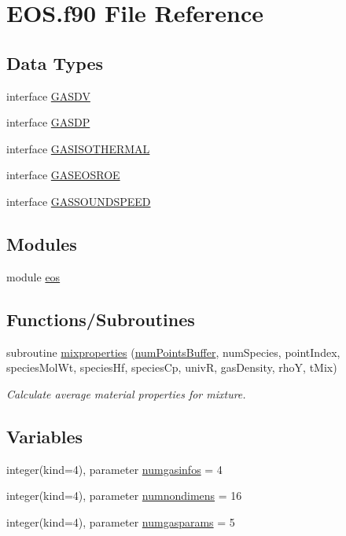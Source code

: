 \hypertarget{EOS_8f90}{}\section{E\+O\+S.\+f90 File Reference}
\label{EOS_8f90}
\subsection*{Data Types}
\begin{DoxyCompactItemize}
\item 
interface \hyperlink{interfaceeos_1_1GASDV}{G\+A\+S\+DV}
\item 
interface \hyperlink{interfaceeos_1_1GASDP}{G\+A\+S\+DP}
\item 
interface \hyperlink{interfaceeos_1_1GASISOTHERMAL}{G\+A\+S\+I\+S\+O\+T\+H\+E\+R\+M\+AL}
\item 
interface \hyperlink{interfaceeos_1_1GASEOSROE}{G\+A\+S\+E\+O\+S\+R\+OE}
\item 
interface \hyperlink{interfaceeos_1_1GASSOUNDSPEED}{G\+A\+S\+S\+O\+U\+N\+D\+S\+P\+E\+ED}
\end{DoxyCompactItemize}
\subsection*{Modules}
\begin{DoxyCompactItemize}
\item 
module \hyperlink{namespaceeos}{eos}
\end{DoxyCompactItemize}
\subsection*{Functions/\+Subroutines}
\begin{DoxyCompactItemize}
\item 
subroutine \hyperlink{namespaceeos_aca70c80cb10c8ae79d29cecf6474e85a}{mixproperties} (\hyperlink{WENOKernels_8H_a86c25ff33e6d9bccfabdf45dc5ddf24c}{num\+Points\+Buffer}, num\+Species, point\+Index, species\+Mol\+Wt, species\+Hf, species\+Cp, univR, gas\+Density, rhoY, t\+Mix)
\begin{DoxyCompactList}\small\item\em Calculate average material properties for mixture. \end{DoxyCompactList}\end{DoxyCompactItemize}
\subsection*{Variables}
\begin{DoxyCompactItemize}
\item 
integer(kind=4), parameter \hyperlink{namespaceeos_ae3be5cc8a1583f01f17df576ad87bc32}{numgasinfos} = 4
\item 
integer(kind=4), parameter \hyperlink{namespaceeos_ad4f9e001c613d757ed00087617a0d158}{numnondimens} = 16
\item 
integer(kind=4), parameter \hyperlink{namespaceeos_ad25ac74c4fda2578144b6019873d260d}{numgasparams} = 5
\end{DoxyCompactItemize}
